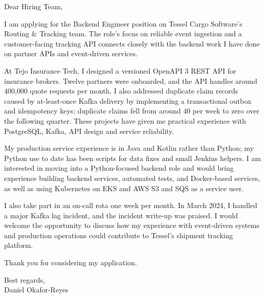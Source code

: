 \documentclass[11pt,a4paper]{article}
\begin{document}
Dear Hiring Team,

I am applying for the Backend Engineer position on Tessel Cargo Software's Routing \& Tracking team. The role's focus on reliable event ingestion and a customer-facing tracking API connects closely with the backend work I have done on partner APIs and event-driven services.

At Tejo Insurance Tech, I designed a versioned OpenAPI 3 REST API for insurance brokers. Twelve partners were onboarded, and the API handles around 400,000 quote requests per month. I also addressed duplicate claim records caused by at-least-once Kafka delivery by implementing a transactional outbox and idempotency keys; duplicate claims fell from around 40 per week to zero over the following quarter. These projects have given me practical experience with PostgreSQL, Kafka, API design and service reliability.

My production service experience is in Java and Kotlin rather than Python; my Python use to date has been scripts for data fixes and small Jenkins helpers. I am interested in moving into a Python-focused backend role and would bring experience building backend services, automated tests, and Docker-based services, as well as using Kubernetes on EKS and AWS S3 and SQS as a service user.

I also take part in an on-call rota one week per month. In March 2024, I handled a major Kafka lag incident, and the incident write-up was praised. I would welcome the opportunity to discuss how my experience with event-driven systems and production operations could contribute to Tessel's shipment tracking platform.

Thank you for considering my application.

Best regards,\\
Daniel Okafor-Reyes
\end{document}
